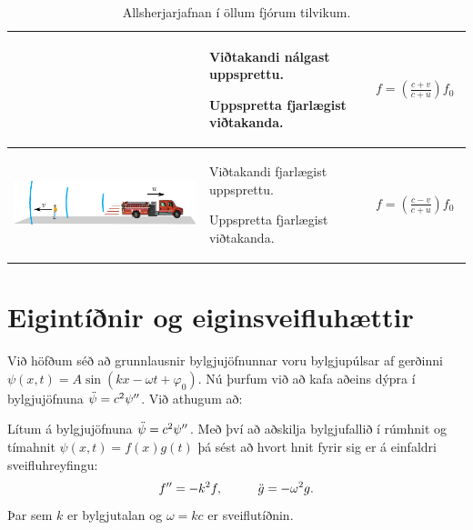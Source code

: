 \ifdefined \wholebook \else\documentclass[oneside]{book}\usepackage{EdlBook}\graphicspath{{figures/}}
\begin{document}
\begin{table}[h!]
\begin{tabular}{ | c | m{5.2cm} | m{2.5cm} | }
\begin{minipage}{.4\textwidth}
    \vspace{0.3cm}
    \end{minipage}
    &
      Viðtakandi nálgast uppsprettu. \par Uppspretta fjarlægist viðtakanda.
    & 
      \begin{align*}
          f = \left( \frac{c + v}{c + u} \right)f_0
      \end{align*}
    \\ \hline
    \begin{minipage}{.4\textwidth}
    \vspace{0.3cm}
    \centering
      \includegraphics[width=0.95\linewidth]{figures/doppler-tilvik34.pdf}
    \vspace{0.3cm}
    \end{minipage}
    &
      Viðtakandi fjarlægist uppsprettu. \par Uppspretta fjarlægist viðtakanda.
    & 
      \begin{align*}
          f = \left( \frac{c - v}{c + u} \right)f_0
      \end{align*}
    \\ \hline
  \end{tabular}
  \caption{Allsherjarjafnan í öllum fjórum tilvikum.} \label{table:hverfi}
\end{table}

\newpage

\section{Eigintíðnir og eiginsveifluhættir}

Við höfðum séð að grunnlausnir bylgjujöfnunnar voru bylgjupúlsar af gerðinni $\psi(x,t) = A\sin(kx-\omega t + \varphi_0)$. Nú þurfum við að kafa aðeins dýpra í bylgjujöfnuna $\Ddot{\psi} = c^2\psi''$. Við athugum að:
\begin{tcolorbox}
\begin{theorem}
Lítum á bylgjujöfnuna $\Ddot{\psi} = c^2\psi''$. Með því að aðskilja bylgjufallið í rúmhnit og tímahnit $\psi(x,t) = f(x)g(t)$ þá sést að hvort hnit fyrir sig er á einfaldri sveifluhreyfingu:
\begin{align*}
    f'' = -k^2f, \hspace{1cm} \Ddot{g} = -\omega^2g.
\end{align*}
Þar sem $k$ er bylgjutalan og $\omega = kc$ er sveiflutíðnin.
\end{theorem}
\end{tcolorbox}
\end{document}
